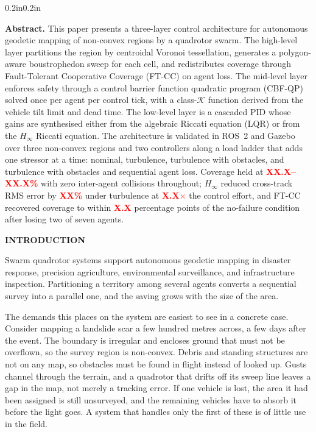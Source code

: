 \documentclass[10pt,letterpaper]{article}
\newcommand{\headingone}[1]{%
    \par\vspace{9pt}%
    {\centering\fontsize{12}{14}\selectfont\bfseries\MakeUppercase{#1}\par}%
    \vspace{4pt}\noindent\ignorespaces}
\newcommand{\val}[1]{\textcolor{red}{\textbf{#1}}}
\begin{document}
\begin{adjustwidth}{0.2in}{0.2in}
    {\fontsize{9}{11}\selectfont
        \noindent\textbf{Abstract.} This paper presents a three-layer control architecture
        for autonomous geodetic mapping of non-convex regions by a quadrotor swarm. The
        high-level layer partitions the region by centroidal Voronoi tessellation, generates
        a polygon-aware boustrophedon sweep for each cell, and redistributes coverage through
        Fault-Tolerant Cooperative Coverage (FT-CC) on agent loss. The mid-level layer
        enforces safety through a control barrier function quadratic program (CBF-QP) solved
        once per agent per control tick, with a class-$\mathcal{K}$ function derived from the
        vehicle tilt limit and dead time. The low-level layer is a cascaded PID whose gains
        are synthesised either from the algebraic Riccati equation (LQR) or from the
        $H_\infty$ Riccati equation. The architecture is validated in ROS~2 and Gazebo over three
        non-convex regions and two controllers along a load ladder that adds one stressor at
        a time: nominal, turbulence, turbulence with obstacles, and turbulence with obstacles
        and sequential agent loss. Coverage held at \val{XX.X--XX.X\%} with zero inter-agent
        collisions throughout; $H_\infty$ reduced cross-track RMS error by \val{XX\%} under
        turbulence at \val{X.X$\times$} the control effort, and FT-CC recovered coverage to
        within \val{X.X} percentage points of the no-failure condition after losing two of
        seven agents.
        \par}
\end{adjustwidth}

\headingone{Introduction}

Swarm quadrotor systems support autonomous geodetic mapping in disaster response,
precision agriculture, environmental surveillance, and infrastructure inspection.
Partitioning a territory among several agents converts a sequential survey into a parallel
one, and the saving grows with the size of the area.

The demands this places on the system are easiest to see in a concrete case. Consider
mapping a landslide scar a few hundred metres across, a few days after the event. The
boundary is irregular and encloses ground that must not be overflown, so the survey region
is non-convex. Debris and standing structures are not on any map, so obstacles must be
found in flight instead of looked up. Gusts channel through the terrain, and a quadrotor
that drifts off its sweep line leaves a gap in the map, not merely a tracking error. If one
vehicle is lost, the area it had been assigned is still unsurveyed, and the remaining
vehicles have to absorb it before the light goes. A system that handles only the first of
these is of little use in the field.
\end{document}
